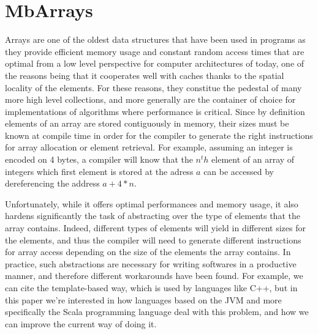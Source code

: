 \section{MbArrays}
\label{sec:mbarrays}


Arrays are one of the oldest data structures that have been used in programs as they provide efficient memory usage and constant random access times that are optimal from a low level perspective for computer architectures of today, one of the reasons being that it cooperates well with caches thanks to the spatial locality of the elements. For these reasons, they constitue the pedestal of many more high level collections, and more generally are the container of choice for implementations of algorithms where performance is critical. Since by definition elements of an array are stored contiguously in memory, their sizes must be known at compile time in order for the compiler to generate the right instructions for array allocation or element retrieval. For example, assuming an integer is encoded on 4 bytes, a compiler will know that the $n^th$ element of an array of integers which first element is stored at the adress $a$ can be accessed by dereferencing the address $a + 4*n$.


Unfortunately, while it offers optimal performances and memory usage, it also hardens significantly the task of abstracting over the type of elements that the array contains. Indeed, different types of elements will yield in different sizes for the elements, and thus the compiler will need to generate different instructions for array access depending on the size of the elements the array contains. In practice, such abstractions are necessary for writing softwares in a productive manner, and therefore different workarounds have been found. For example, we can cite the template-based way, which is used by languages like C++, but in this paper we're interested in how languages based on the JVM and more specifically the Scala programming language deal with this problem, and how we can improve the current way of doing it. 

